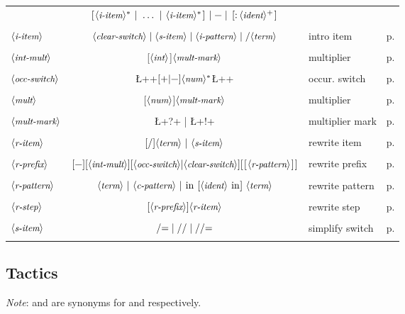 \begin{longtable}{lclr}
& $ \C{[} \N{i-item}^* \;\C{|}\;\dots\;\C{|}\;\N{i-item}^* \C{]}\;|\;
    \C{-}\;|\;\C{[:} \N{ident}^+\C{]}
 $ &\\
\\
$\langle\mbox{\itshape\rmfamily\small i-item}\rangle$ & $\N{clear-switch} \;|\; \N{s-item} \;|\;
\N{i-pattern} \;|\; \C{/}\N{term}$ & intro item & p. \pageref{ssec:intro}\\
\\
$\langle\mbox{\itshape\rmfamily\small int-mult}\rangle$ & [$\langle\mbox{\itshape\rmfamily\small int}\rangle$]$\langle\mbox{\itshape\rmfamily\small mult-mark}\rangle$ & multiplier &
 p. \pageref{ssec:iter}\\
\\
$\langle\mbox{\itshape\rmfamily\small occ-switch}\rangle$ & \L+{+$[\C{+}|\C{-}]\N{num}^*$\L+}+ &
 occur. switch &  p. \pageref{sssec:occselect}\\
\\
$\langle\mbox{\itshape\rmfamily\small mult}\rangle$ & [$\langle\mbox{\itshape\rmfamily\small num}\rangle$]$\langle\mbox{\itshape\rmfamily\small mult-mark}\rangle$ & multiplier &
 p. \pageref{ssec:iter}\\
\\
$\langle\mbox{\itshape\rmfamily\small mult-mark}\rangle$ &  \L+?+ | \L+!+ & multiplier mark &  p. \pageref{ssec:iter}\\
\\
$\langle\mbox{\itshape\rmfamily\small r-item}\rangle$ &  $[\C{/}]\N{term} \ |\ \N{s-item}$ & rewrite item & p. \pageref{ssec:extrw}\\
\\
$\langle\mbox{\itshape\rmfamily\small r-prefix}\rangle$ & $[\C{-}][\N{int-mult}][\N{occ-switch} |
\N{clear-switch}][\C{[}\N{r-pattern}\C{]}]$ & rewrite prefix & p. \pageref{ssec:extrw}\\
\\
$\langle\mbox{\itshape\rmfamily\small r-pattern}\rangle$ &
   $\N{term}\ |\ \N{c-pattern}\ |\ \C{in}\ [\N{ident}\ \C{in}]\ \N{term} $ & 
   rewrite pattern & p. \pageref{ssec:extrw}\\
\\
$\langle\mbox{\itshape\rmfamily\small r-step}\rangle$ & $[\langle\mbox{\itshape\rmfamily\small r-prefix}\rangle]\langle\mbox{\itshape\rmfamily\small r-item}\rangle$ & rewrite step & p. \pageref{ssec:extrw}\\
\\
$\langle\mbox{\itshape\rmfamily\small s-item}\rangle$ & $\C{/=} \;|\; \C{//} \;|\; \C{//=}$ &
simplify switch & p. \pageref{ssec:intro}\\
\\
\end{longtable}


\subsection*{Tactics} 
\emph{Note}:  and  are synonyms for  and
 respectively.

